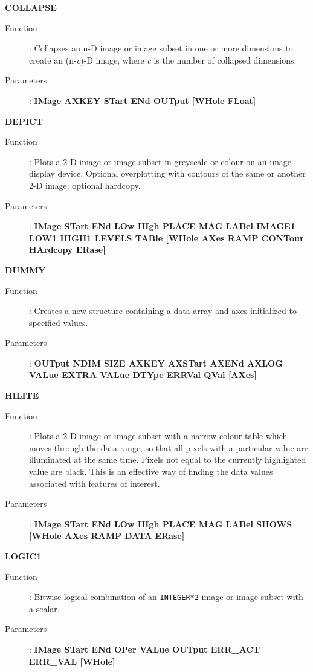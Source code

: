 {\large\bf COLLAPSE \hfill}
\begin{description}
\item[Function]: 
Collapses an n-D image or image subset in one or more dimensions to create an 
(n-{\it c})-D image, where {\it c} is the number of collapsed dimensions.
\item[Parameters]: 
{\bf IMage AXKEY STart ENd OUTput [WHole FLoat]}
\end{description}
\vspace{5mm}

{\large\bf DEPICT \hfill}
\begin{description}
\item[Function]: 
Plots a 2-D image or image subset in greyscale or colour on an image display 
device. Optional overplotting with contours of the same or another 2-D image; 
optional hardcopy.
\item[Parameters]: 
{\bf IMage STart ENd LOw HIgh PLACE MAG LABel IMAGE1 LOW1 HIGH1 LEVELS TABle 
[WHole AXes RAMP CONTour HArdcopy ERase]}
\end{description}
\vspace{5mm}

{\large\bf DUMMY \hfill}
\begin{description}
\item[Function]: 
Creates a new structure containing a data array and axes initialized to
specified values.
\item[Parameters]: 
{\bf OUTput NDIM SIZE AXKEY AXSTart AXENd AXLOG VALue EXTRA VALue
DTYpe ERRVal QVal [AXes]} 
\end{description}

{\large\bf HILITE \hfill}
\begin{description}
\item[Function]: 
Plots a 2-D image or image subset with a narrow colour table which moves
through the data range, so that all pixels with a particular value are 
illuminated at the same time. Pixels not equal to the currently highlighted
value are black. This is an effective way of finding the data values associated
with features of interest.
\item[Parameters]: 
{\bf IMage STart ENd LOw HIgh PLACE MAG LABel SHOWS [WHole AXes RAMP DATA
ERase]}
\end{description}
\vspace{5mm}

{\large\bf LOGIC1 \hfill}
\begin{description}
\item[Function]: 
Bitwise logical combination of an {\tt INTEGER*2} image or image subset with a 
scalar.
\item[Parameters]: 
{\bf IMage STart ENd OPer VALue OUTput ERR\_ACT ERR\_VAL [WHole]}
\end{description}
\vspace{5mm}

